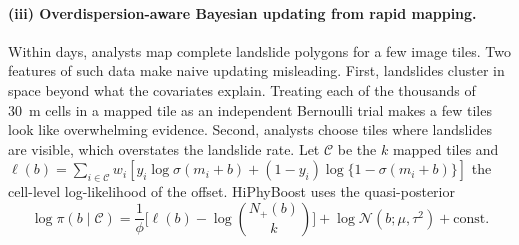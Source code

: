 \paragraph{(iii) Overdispersion-aware Bayesian updating from rapid mapping.} Within days, analysts map complete landslide polygons for a few image tiles. Two features of such data make naive updating misleading. First, landslides cluster in space beyond what the covariates explain. Treating each of the thousands of 30~m cells in a mapped tile as an independent Bernoulli trial makes a few tiles look like overwhelming evidence. Second, analysts choose tiles where landslides are visible, which overstates the landslide rate. Let $\mathcal{C}$ be the $k$ mapped tiles and $\ell(b)=\sum_{i\in\mathcal{C}} w_i[y_i\log\sigma(m_i+b)+(1-y_i)\log\{1-\sigma(m_i+b)\}]$ the cell-level log-likelihood of the offset. HiPhyBoost uses the quasi-posterior
\begin{equation}\label{eq:post}
\log \pi(b\mid \mathcal{C}) = \frac{1}{\phi}\Big[\ell(b) - \log\binom{N_+(b)}{k}\Big] + \log\mathcal{N}(b;\mu,\tau^2) + \text{const}.
\end{equation}
